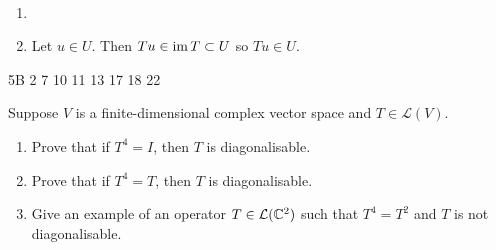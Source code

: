 \begin{solution} \
\begin{enumerate}[label=(\roman*)]
\item 
\item Let $u\in U$. Then $Tu\in\operatorname{im} T\subset U$ so $Tu\in U$.
\end{enumerate}
\end{solution}

\begin{exercise}

\end{exercise}

\begin{exercise}

\end{exercise}

\begin{exercise}

\end{exercise}

\begin{exercise}

\end{exercise}

\begin{exercise}

\end{exercise}

\begin{exercise}

\end{exercise}

5B 2 7 10 11 13 17 18 22 

\begin{exercise}
Suppose $V$ is a finite-dimensional complex vector space and $T\in\mathcal{L}(V)$.
\begin{enumerate}[label=(\roman*)]
\item Prove that if $T^4=I$, then $T$ is diagonalisable.
\item Prove that if $T^4=T$, then $T$ is diagonalisable.
\item Give an example of an operator $T\in\mathcal{L}(\mathbb C^2)$ such that $T^4=T^2$ and $T$ is not diagonalisable.
\end{enumerate}
\end{exercise}

